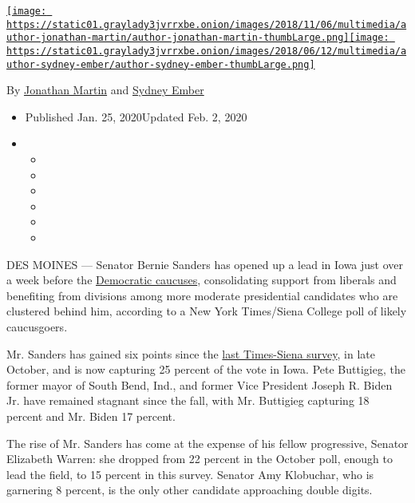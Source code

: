 \href{https://www.nytimes3xbfgragh.onion/by/jonathan-martin}{\texttt{[image: https://static01.graylady3jvrrxbe.onion/images/2018/11/06/multimedia/author-jonathan-martin/author-jonathan-martin-thumbLarge.png]}}\href{https://www.nytimes3xbfgragh.onion/by/sydney-ember}{\texttt{[image: https://static01.graylady3jvrrxbe.onion/images/2018/06/12/multimedia/author-sydney-ember/author-sydney-ember-thumbLarge.png]}}

By \href{https://www.nytimes3xbfgragh.onion/by/jonathan-martin}{Jonathan
Martin} and
\href{https://www.nytimes3xbfgragh.onion/by/sydney-ember}{Sydney Ember}

\begin{itemize}
\item
  Published Jan. 25, 2020Updated Feb. 2, 2020
\item
  \begin{itemize}
  \item
  \item
  \item
  \item
  \item
  \item
  \end{itemize}
\end{itemize}

DES MOINES --- Senator Bernie Sanders has opened up a lead in Iowa just
over a week before the
\href{https://www.nytimes3xbfgragh.onion/live/2020/iowa-democratic-caucus-01-26/}{Democratic
caucuses}, consolidating support from liberals and benefiting from
divisions among more moderate presidential candidates who are clustered
behind him, according to a New York Times/Siena College poll of likely
caucusgoers.

Mr. Sanders has gained six points since the
\href{https://www.nytimes3xbfgragh.onion/2019/11/01/us/politics/iowa-poll-warren-biden.html}{last
Times-Siena survey}, in late October, and is now capturing 25 percent of
the vote in Iowa. Pete Buttigieg, the former mayor of South Bend, Ind.,
and former Vice President Joseph R. Biden Jr. have remained stagnant
since the fall, with Mr. Buttigieg capturing 18 percent and Mr. Biden 17
percent.

The rise of Mr. Sanders has come at the expense of his fellow
progressive, Senator Elizabeth Warren: she dropped from 22 percent in
the October poll, enough to lead the field, to 15 percent in this
survey. Senator Amy Klobuchar, who is garnering 8 percent, is the only
other candidate approaching double digits.

